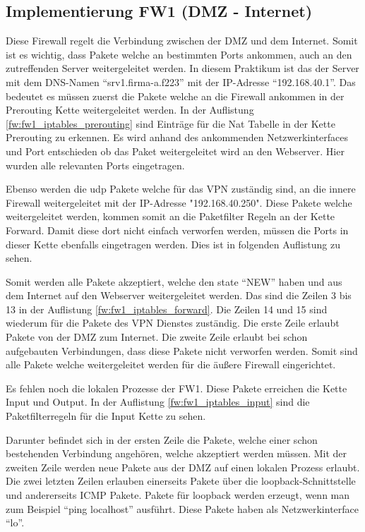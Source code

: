 \subsection{Implementierung FW1 (DMZ - Internet)}
Diese Firewall regelt die Verbindung zwischen der DMZ und dem Internet. Somit ist es wichtig, dass Pakete welche an bestimmten Ports ankommen, auch an den zutreffenden Server weitergeleitet werden. In diesem Praktikum ist das der Server mit dem DNS-Namen "`srv1.firma-a.f223"' mit der IP-Adresse "`192.168.40.1"'. Das bedeutet es müssen zuerst die Pakete welche an die Firewall ankommen in der Prerouting Kette weitergeleitet werden. In der Auflistung \ref{fw:fw1_iptables_prerouting} sind Einträge für die Nat Tabelle in der Kette Prerouting zu erkennen. Es wird anhand des ankommenden Netzwerkinterfaces und Port entschieden ob das Paket weitergeleitet wird an den Webserver. Hier wurden alle relevanten Ports eingetragen.

Ebenso werden die udp Pakete welche für das VPN zuständig sind, an die innere Firewall weitergeleitet mit der IP-Adresse "192.168.40.250". Diese Pakete welche weitergeleitet werden, kommen somit an die Paketfilter Regeln an der Kette Forward. Damit diese dort nicht einfach verworfen werden, müssen die Ports in dieser Kette ebenfalls eingetragen werden. Dies ist in folgenden Auflistung zu sehen.

Somit werden alle Pakete akzeptiert, welche den state "`NEW"' haben und aus dem Internet auf den Webserver weitergeleitet werden. Das sind die Zeilen 3 bis 13 in der Auflistung \ref{fw:fw1_iptables_forward}. Die Zeilen 14 und 15 sind wiederum für die Pakete des VPN Dienstes zuständig. Die erste Zeile erlaubt Pakete von der DMZ zum Internet. Die zweite Zeile erlaubt bei schon aufgebauten Verbindungen, dass diese Pakete nicht verworfen werden. Somit sind alle Pakete welche weitergeleitet werden für die äußere Firewall eingerichtet.

Es fehlen noch die lokalen Prozesse der FW1. Diese Pakete erreichen die Kette Input und Output. In der Auflistung \ref{fw:fw1_iptables_input} sind die Paketfilterregeln für die Input Kette zu sehen.

Darunter befindet sich in der ersten Zeile die Pakete, welche einer schon bestehenden Verbindung angehören, welche akzeptiert werden müssen. Mit der zweiten Zeile werden neue Pakete aus der DMZ auf einen lokalen Prozess erlaubt. Die zwei letzten Zeilen erlauben einerseits Pakete über die loopback-Schnittstelle und andererseits ICMP Pakete. Pakete für loopback werden erzeugt, wenn man zum Beispiel "`ping localhost"' ausführt. Diese Pakete haben als Netzwerkinterface "`lo"'.


